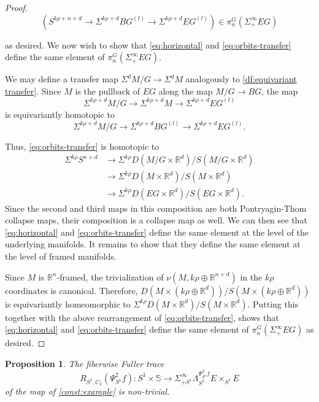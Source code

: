 \documentclass[11pt]{amsart}
\newcommand{\R}{\mathbb R}
\newcommand{\Sph}{\mathbb{S}}
\theoremstyle{plain}   %
\newtheorem{prop}[thm]{Proposition}
\theoremstyle{definition}
\theoremstyle{remark}
\numberwithin{equation}{section}
\begin{document}
\begin{proof}
\begin{equation}\label{eq:orbits-transfer}
(S^{k\rho+n+d}\to \Sigma^{k\rho+d} BG^{(l)} \to \Sigma^{k\rho+d}EG^{(l)})\in\pi_n^G(\Sigma_+^\infty EG)
\end{equation}

as desired. We now wish to show that \cref{eq:horizontal} and \cref{eq:orbits-transfer} define the same element of $\pi_n^G(\Sigma_+^\infty EG)$. 

We may define a transfer map $\Sigma^dM/G\to \Sigma^d M$ analogously to \cref{df:equivariant transfer}. Since $M$ is the pullback of $EG$ along the map $M/G\to BG$, the map 
\[
\Sigma^{k\rho+d} M/G\to \Sigma^{k\rho+d} M\to \Sigma^{k\rho +d} EG^{(l)}
\]
is equivariantly homotopic to  
\[
\Sigma^{k\rho+d} M/G\to \Sigma^{k\rho+d} BG^{(l)}\to \Sigma^{k\rho +d} EG^{(l)}.
\]

Thus, \cref{eq:orbits-transfer} is homotopic to 
\begin{align*}
\Sigma^{k\rho}S^{n+d}
&\to \Sigma^{k\rho}D(M/G\times \R^d)/S(M/G\times\R^{d})\\
&\to \Sigma^{k\rho}D(M\times\R^d)/S(M\times \R^d)\\
&\to \Sigma^{k\rho}D(EG\times\R^d)/S(EG\times\R^d).
\end{align*}
Since the second and third maps in this composition are both Pontryagin-Thom collapse maps, their composition is a collapse map as well. We can then see that \cref{eq:horizontal} and \cref{eq:orbits-transfer} define the same element at the level of the underlying manifolds. It remains to show that they define the same element at the level of framed manifolds.  

Since $M$ is $\R^n$-framed, the trivialization of $\nu(M,k\rho\oplus\R^{n+d})$ in the $k\rho$ coordinates is canonical. Therefore, $D(M\times (k\rho\oplus\R^d))/S(M\times (k\rho\oplus\R^d))$ is equivariantly homeomorphic to $\Sigma^{k\rho}D(M\times \R^d)/S(M\times\R^d)$. Putting this together with the above rearrangement of \cref{eq:orbits-transfer}, shows that \cref{eq:horizontal} and \cref{eq:orbits-transfer} define the same element of $\pi_n^G(\Sigma_+^\infty EG)$ as desired. 
\end{proof}

\begin{prop}\label{prop:nontrivial fuller trace}
The fiberwise Fuller trace
\[
R_{S^1,C_2}(\Psi_{S^1}^{2}f):S^1\times \Sph \to \Sigma_{+S^1}^\infty \Lambda_{S^1}^{\Psi_{S^1}^{2}f}E\times_{S^1}E
\]
of the map of \cref{const:example} is non-trivial.
\end{prop}
\end{document}
